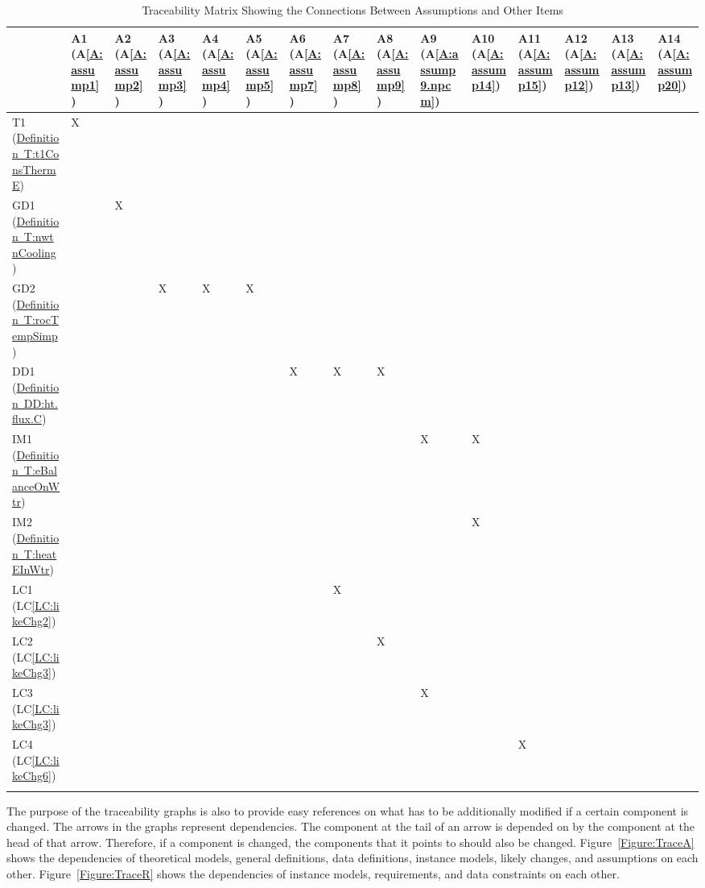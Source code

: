 \documentclass[12pt]{article}
\begin{document}
\begin{longtable}{l l l l l l l l l l l l l l l}
\toprule
 & A1 (A\ref{A:assump1}) & A2 (A\ref{A:assump2}) & A3 (A\ref{A:assump3}) & A4 (A\ref{A:assump4}) & A5 (A\ref{A:assump5}) & A6 (A\ref{A:assump7}) & A7 (A\ref{A:assump8}) & A8 (A\ref{A:assump9}) & A9 (A\ref{A:assump9.npcm}) & A10 (A\ref{A:assump14}) & A11 (A\ref{A:assump15}) & A12 (A\ref{A:assump12}) & A13 (A\ref{A:assump13}) & A14 (A\ref{A:assump20})
\\
\midrule
T1 (\hyperref[T:t1ConsThermE]{Definition~T:t1ConsThermE}) & X &  &  &  &  &  &  &  &  &  &  &  &  & 
\\
GD1 (\hyperref[T:nwtnCooling]{Definition~T:nwtnCooling}) &  & X &  &  &  &  &  &  &  &  &  &  &  & 
\\
GD2 (\hyperref[T:rocTempSimp]{Definition~T:rocTempSimp}) &  &  & X & X & X &  &  &  &  &  &  &  &  & 
\\
DD1 (\hyperref[DD:ht.flux.C]{Definition~DD:ht.flux.C}) &  &  &  &  &  & X & X & X &  &  &  &  &  & 
\\
IM1 (\hyperref[T:eBalanceOnWtr]{Definition~T:eBalanceOnWtr}) &  &  &  &  &  &  &  &  & X & X &  &  &  & 
\\
IM2 (\hyperref[T:heatEInWtr]{Definition~T:heatEInWtr}) &  &  &  &  &  &  &  &  &  & X &  &  &  & 
\\
LC1 (LC\ref{LC:likeChg2}) &  &  &  &  &  &  & X &  &  &  &  &  &  & 
\\
LC2 (LC\ref{LC:likeChg3}) &  &  &  &  &  &  &  & X &  &  &  &  &  & 
\\
LC3 (LC\ref{LC:likeChg3}) &  &  &  &  &  &  &  &  & X &  &  &  &  & 
\\
LC4 (LC\ref{LC:likeChg6}) &  &  &  &  &  &  &  &  &  &  & X &  &  & 
\\
\bottomrule
\caption{Traceability Matrix Showing the Connections Between Assumptions and Other Items}
\label{Table:TraceyAI}
\end{longtable}
The purpose of the traceability graphs is also to provide easy references on what has to be additionally modified if a certain component is changed. The arrows in the graphs represent dependencies. The component at the tail of an arrow is depended on by the component at the head of that arrow. Therefore, if a component is changed, the components that it points to should also be changed. Figure~\ref{Figure:TraceA} shows the dependencies of theoretical models, general definitions, data definitions, instance models, likely changes, and assumptions on each other. Figure~\ref{Figure:TraceR} shows the dependencies of instance models, requirements, and data constraints on each other.
\end{document}
